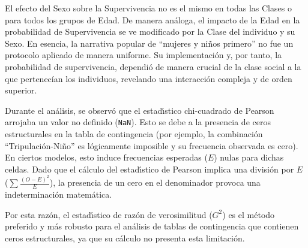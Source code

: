 El efecto del Sexo sobre la Supervivencia no es el mismo en todas las Clases o para todos los grupos de Edad.
De manera an\'{a}loga, el impacto de la Edad en la probabilidad de Supervivencia se ve modificado por la Clase del individuo y su Sexo.
En esencia, la narrativa popular de ``mujeres y ni\~{n}os primero'' no fue un protocolo aplicado de manera uniforme. Su implementaci\'{o}n y, por tanto, la probabilidad de supervivencia, dependi\'{o} de manera crucial de la clase social a la que pertenec\'{i}an los individuos, revelando una interacci\'{o}n compleja y de orden superior.

Durante el an\'{a}lisis, se observ\'{o} que el estad\'{\i}stico chi-cuadrado de Pearson arrojaba un valor no definido (\texttt{NaN}). Esto se debe a la presencia de ceros estructurales en la tabla de contingencia (por ejemplo, la combinaci\'{o}n ``Tripulaci\'{o}n-Ni\~{n}o'' es l\'{o}gicamente imposible y su frecuencia observada es cero). En ciertos modelos, esto induce frecuencias esperadas ($E$) nulas para dichas celdas. Dado que el c\'{a}lculo del estad\'{\i}stico de Pearson implica una divisi\'{o}n por $E$ ($\sum \frac{(O-E)^2}{E}$), la presencia de un cero en el denominador provoca una indeterminaci\'{o}n matem\'{a}tica.

Por esta raz\'{o}n, el estad\'{\i}stico de raz\'{o}n de verosimilitud ($G^2$) es el m\'{e}todo preferido y m\'{a}s robusto para el an\'{a}lisis de tablas de contingencia que contienen ceros estructurales, ya que su c\'{a}lculo no presenta esta limitaci\'{o}n.

\clearpage